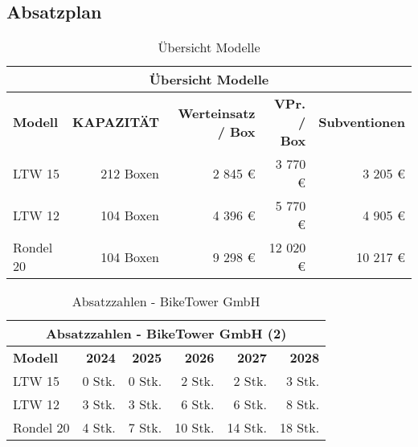 \subsection{Absatzplan}

\begin{table}[H]
    \centering
    \begin{tabular}{lrrrr}
        \multicolumn{5}{c}{\textbf{Übersicht Modelle}}                                                                  \\
        \toprule
        \textbf{Modell} & \textbf{KAPAZITÄT} & \textbf{Werteinsatz / Box} & \textbf{VPr. / Box} & \textbf{Subventionen} \\
        \midrule
        LTW 15          & 212 Boxen          & 2 845 \euro{}              & 3 770 \euro{}       & 3 205 \euro{}         \\
        LTW 12          & 104 Boxen          & 4 396 \euro{}              & 5 770 \euro{}       & 4 905 \euro{}         \\
        Rondel 20       & 104 Boxen          & 9 298 \euro{}              & 12 020 \euro{}      & 10 217 \euro{}        \\
        \bottomrule
    \end{tabular}
    \caption{Übersicht Modelle}
    \label{tab:uebersicht_modelle}
\end{table}

\begin{table}[H]
    \centering
    \begin{tabular}{lrrrrr}
        \multicolumn{6}{c}{\textbf{Absatzzahlen - BikeTower GmbH (2)}}                                  \\
        \toprule
        \textbf{Modell} & \textbf{2024} & \textbf{2025} & \textbf{2026} & \textbf{2027} & \textbf{2028} \\
        \midrule
        LTW 15          & 0 Stk.        & 0 Stk.        & 2 Stk.        & 2 Stk.        & 3 Stk.        \\
        LTW 12          & 3 Stk.        & 3 Stk.        & 6 Stk.        & 6 Stk.        & 8 Stk.        \\
        Rondel 20       & 4 Stk.        & 7 Stk.        & 10 Stk.       & 14 Stk.       & 18 Stk.       \\
        \midrule
    \end{tabular}
    \caption{Absatzzahlen - BikeTower GmbH}
\end{table}

